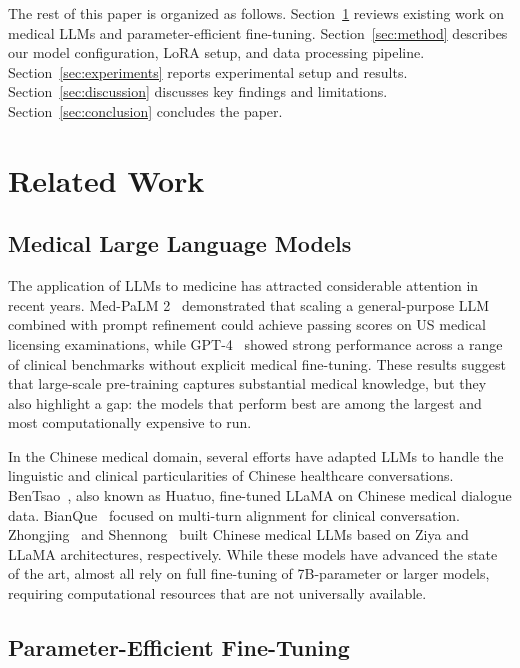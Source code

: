 \documentclass[11pt,a4paper]{article}
\begin{document}
The rest of this paper is organized as follows. Section~\ref{sec:related} reviews existing work on medical LLMs and parameter-efficient fine-tuning. Section~\ref{sec:method} describes our model configuration, LoRA setup, and data processing pipeline. Section~\ref{sec:experiments} reports experimental setup and results. Section~\ref{sec:discussion} discusses key findings and limitations. Section~\ref{sec:conclusion} concludes the paper.

\section{Related Work}
\label{sec:related}

\subsection{Medical Large Language Models}

The application of LLMs to medicine has attracted considerable attention in recent years. Med-PaLM 2~\cite{singhal2023medpalm} demonstrated that scaling a general-purpose LLM combined with prompt refinement could achieve passing scores on US medical licensing examinations, while GPT-4~\cite{nori2023gpt4} showed strong performance across a range of clinical benchmarks without explicit medical fine-tuning. These results suggest that large-scale pre-training captures substantial medical knowledge, but they also highlight a gap: the models that perform best are among the largest and most computationally expensive to run.

In the Chinese medical domain, several efforts have adapted LLMs to handle the linguistic and clinical particularities of Chinese healthcare conversations. BenTsao~\cite{wang2023bentsao}, also known as Huatuo, fine-tuned LLaMA on Chinese medical dialogue data. BianQue~\cite{chen2023bianque} focused on multi-turn alignment for clinical conversation. Zhongjing~\cite{yang2023zhongjing} and Shennong~\cite{shennong2023} built Chinese medical LLMs based on Ziya and LLaMA architectures, respectively. While these models have advanced the state of the art, almost all rely on full fine-tuning of 7B-parameter or larger models, requiring computational resources that are not universally available.

\subsection{Parameter-Efficient Fine-Tuning}
\end{document}
